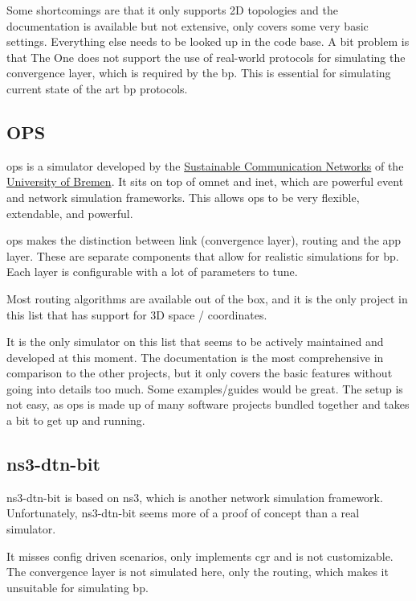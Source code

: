 Some shortcomings are that it only supports 2D topologies and the documentation is available but not extensive, only covers some very basic settings. Everything else needs to be looked up in the code base.
A bit problem is that The One does not support the use of real-world protocols for simulating the convergence layer, which is required by the \ac{bp}. This is essential for simulating current state of the art \ac{bp} protocols.

\subsection{OPS}

\ac{ops} is a simulator developed by the \href{https://www.uni-bremen.de/comnets}{Sustainable Communication Networks} of the \href{https://www.uni-bremen.de/}{University of Bremen}. It sits on top of \ac{omnet} and \ac{inet}, which are powerful event and network simulation frameworks. This allows \ac{ops} to be very flexible, extendable, and powerful.

\ac{ops} makes the distinction between link (convergence layer), routing and the app layer. These are separate components that allow for realistic simulations for \ac{bp}. Each layer is configurable with a lot of parameters to tune.

Most routing algorithms are available out of the box, and it is the only project in this list that has support for 3D space / coordinates.

It is the only simulator on this list that seems to be actively maintained and developed at this moment. The documentation is the most comprehensive in comparison to the other projects, but it only covers the basic features without going into details too much. Some examples/guides would be great. The setup is not easy, as \ac{ops} is made up of many software projects bundled together and takes a bit to get up and running.

\subsection{ns3-dtn-bit}

ns3-dtn-bit is based on \ac{ns3}, which is another network simulation framework. Unfortunately, ns3-dtn-bit seems more of a proof of concept than a real simulator.

It misses config driven scenarios, only implements \ac{cgr} and is not customizable. The convergence layer is not simulated here, only the routing, which makes it unsuitable for simulating \ac{bp}.

